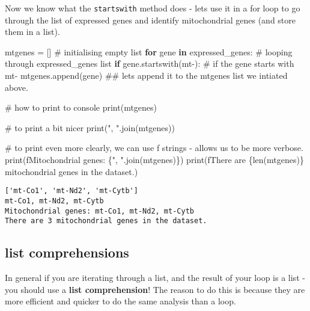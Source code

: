 \documentclass[
  letterpaper,
  DIV=11,
  numbers=noendperiod]{scrartcl}
\newenvironment{Shaded}{\begin{snugshade}}{\end{snugshade}}
\newcommand{\BuiltInTok}[1]{\textcolor[rgb]{0.00,0.23,0.31}{#1}}
\newcommand{\CommentTok}[1]{\textcolor[rgb]{0.37,0.37,0.37}{#1}}
\newcommand{\ControlFlowTok}[1]{\textcolor[rgb]{0.00,0.23,0.31}{\textbf{#1}}}
\newcommand{\KeywordTok}[1]{\textcolor[rgb]{0.00,0.23,0.31}{\textbf{#1}}}
\newcommand{\NormalTok}[1]{\textcolor[rgb]{0.00,0.23,0.31}{#1}}
\newcommand{\OperatorTok}[1]{\textcolor[rgb]{0.37,0.37,0.37}{#1}}
\newcommand{\SpecialCharTok}[1]{\textcolor[rgb]{0.37,0.37,0.37}{#1}}
\newcommand{\SpecialStringTok}[1]{\textcolor[rgb]{0.13,0.47,0.30}{#1}}
\newcommand{\StringTok}[1]{\textcolor[rgb]{0.13,0.47,0.30}{#1}}
\begin{document}
Now we know what the \texttt{startswith} method does - lets use it in a
for loop to go through the list of expressed genes and identify
mitochondrial genes (and store them in a list).

\begin{Shaded}
\begin{Highlighting}[]
\NormalTok{mtgenes }\OperatorTok{=}\NormalTok{ [] }\CommentTok{\# initialising empty list}
\ControlFlowTok{for}\NormalTok{ gene }\KeywordTok{in}\NormalTok{ expressed\_genes:    }\CommentTok{\# looping through expressed\_genes list}
  \ControlFlowTok{if}\NormalTok{ gene.startswith(}\StringTok{\textquotesingle{}mt{-}\textquotesingle{}}\NormalTok{):    }\CommentTok{\# if the gene starts with mt{-}}
\NormalTok{    mtgenes.append(gene)            }\CommentTok{\#\# let\textquotesingle{}s append it to the mtgenes list we intiated above.}

\CommentTok{\# how to print to console}
\BuiltInTok{print}\NormalTok{(mtgenes)}

\CommentTok{\# to print a bit nicer}
\BuiltInTok{print}\NormalTok{(}\StringTok{", "}\NormalTok{.join(mtgenes))}

\CommentTok{\# to print even more clearly, we can use f strings {-} allows us to be more verbose.}
\BuiltInTok{print}\NormalTok{(}\SpecialStringTok{f\textquotesingle{}Mitochondrial genes: }\SpecialCharTok{\{}\StringTok{", "}\SpecialCharTok{.}\NormalTok{join(mtgenes)}\SpecialCharTok{\}}\SpecialStringTok{\textquotesingle{}}\NormalTok{)}
\BuiltInTok{print}\NormalTok{(}\SpecialStringTok{f\textquotesingle{}There are }\SpecialCharTok{\{}\BuiltInTok{len}\NormalTok{(mtgenes)}\SpecialCharTok{\}}\SpecialStringTok{ mitochondrial genes in the dataset.\textquotesingle{}}\NormalTok{)}
\end{Highlighting}
\end{Shaded}

\begin{verbatim}
['mt-Co1', 'mt-Nd2', 'mt-Cytb']
mt-Co1, mt-Nd2, mt-Cytb
Mitochondrial genes: mt-Co1, mt-Nd2, mt-Cytb
There are 3 mitochondrial genes in the dataset.
\end{verbatim}

\subsection{list comprehensions}\label{list-comprehensions}

In general if you are iterating through a list, and the result of your
loop is a list - you should use a \textbf{list comprehension}! The
reason to do this is because they are more efficient and quicker to do
the same analysis than a loop.
\end{document}
